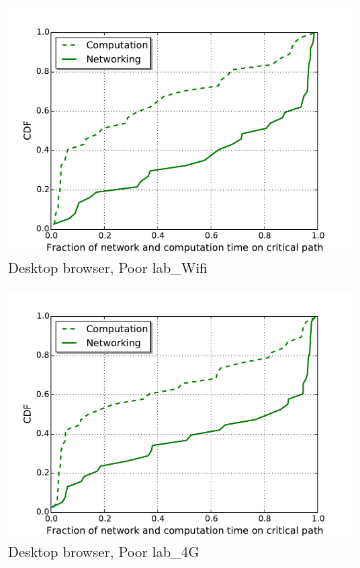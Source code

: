 \begin{figure}[!htb]
    \begin{subfigure}{0.48\textwidth}
        \includegraphics[width=1\linewidth]{./figures/computation/poor/desktop-b20-d150.pdf}
        \caption{Desktop browser, Poor lab\_Wifi}
        \label{fig:non-mobile-b20-d150}
    \end{subfigure}%
    \begin{subfigure}{0.48\textwidth}
        \includegraphics[width=1\linewidth]{./figures/computation/poor/desktop-b5-d150.pdf}
        \caption{Desktop browser, Poor lab\_4G}
        \label{fig:non-mobile-b5-d150}
    \end{subfigure}
   \begin{subfigure}{0.48\textwidth}

\end{subfigure}
\end{figure}
